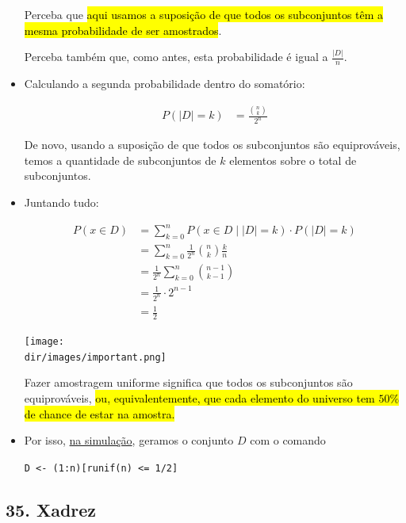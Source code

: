 \documentclass[
  11pt]{report}
\newcommand{\dir}{/ssd/R/x86_64-pc-linux-gnu-library/4.1/fnaufelRmd/rmarkdown/resources}
\newenvironment{rmdimportant}
{
  \begin{myimportant}
    \texttt{[image: \\dir/images/important.png]}
    \tcblower
  }
  {
  \end{myimportant}
}
\begin{document}
\begin{itemize}
  Perceba que {\hl{aqui usamos a suposição de que todos os subconjuntos têm a mesma probabilidade de ser amostrados}}.

  Perceba também que, como antes, esta probabilidade é igual a $\frac{|D|}{n}$.
\item
  Calculando a segunda probabilidade dentro do somatório:

  \[
  \begin{aligned}
  P(|D| = k)
  &= \frac{\binom{n}{k}}{2^n}
  \end{aligned}
  \]

  De novo, usando a suposição de que todos os subconjuntos são equiprováveis, temos a quantidade de subconjuntos de $k$ elementos sobre o total de subconjuntos.
\item
  Juntando tudo:

  \[
  \begin{aligned}
  P(x \in D) 
  &= \sum_{k = 0}^{n} P(x \in D \mid |D| = k) \cdot P(|D| = k) \\
  &= \sum_{k = 0}^{n} \frac 1 {2^n} \binom n k \frac k n \\
  &= \frac 1 {2^n} \sum_{k = 0}^{n} \binom{n - 1}{k - 1} \\
  &= \frac 1 {2^n} \cdot 2^{n - 1} \\
  &= \frac 1 2
  \end{aligned}
  \]

  \begin{rmdimportant}
  Fazer amostragem uniforme significa que todos os subconjuntos são equiprováveis, {\hl{ou, equivalentemente, que cada elemento do universo tem $50\%$ de chance de estar na amostra.}}

  \end{rmdimportant}
\item
  Por isso, \protect\hyperlink{simular-amigos}{na simulação}, geramos o conjunto $D$ com o comando

  \texttt{D\ \textless{}-\ (1:n){[}runif(n)\ \textless{}=\ 1/2{]}}
\end{itemize}

\hypertarget{xadrez}{%
\subsection*{35. Xadrez}\label{xadrez}}
\end{document}
